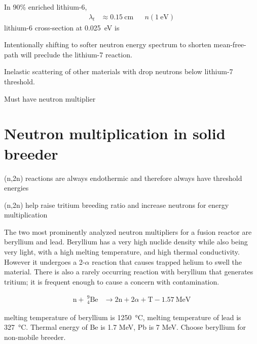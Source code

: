 \documentclass[11pt]{report} %
\begin{document}
In 90\% enriched lithium-6,
\begin{align*}
\lambda_t & \approx \SI{0.15}{\centi\meter} && n(\SI{1}{\electronvolt}) 
\end{align*}
lithium-6 cross-section at \SI{0.025}{\electronvolt} is %

Intentionally shifting to softer neutron energy spectrum to shorten mean-free-path will preclude the lithium-7 reaction.

Inelastic scattering of other materials with drop neutrons below lithium-7 threshold.

Must have neutron multiplier


\section{Neutron multiplication in solid breeder}
(n,2n) reactions are always endothermic and therefore always have threshold energies

(n,2n) help raise tritium breeding ratio and increase neutrons for energy multiplication

The two most prominently analyzed neutron multipliers for a fusion reactor are beryllium and lead. Beryllium has a very high nuclide density while also being very light, with a high melting temperature, and high thermal conductivity. However it undergoes a 2-$\alpha$ reaction that causes trapped helium to swell the material. There is also a rarely occurring reaction with beryllium that generates tritium; it is frequent enough to cause a concern with contamination.

\begin{align}
\mathrm{n} + ~^9_4\mathrm{Be} &\xrightarrow ~2\mathrm{n}+2\alpha + \mathrm{T} -1.57~\text{MeV}\label{eq:Be-n}
\end{align}

melting temperature of beryllium is \SI{1250}{\celsius}, melting temperature of lead is \SI{327}{\celsius}. Thermal energy of Be is 1.7 MeV, Pb is 7 MeV. Choose beryllium for non-mobile breeder.
\end{document}
